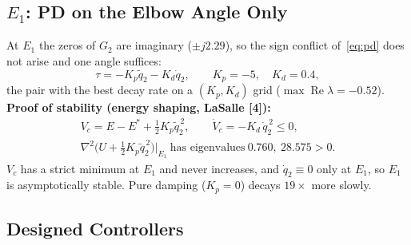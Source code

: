 \documentclass[12pt,a4paper]{article}
\begin{document}
\subsection{$E_1$: PD on the Elbow Angle Only}
At $E_1$ the zeros of $G_2$ are imaginary ($\pm j2.29$), so the sign conflict of~\eqref{eq:pd} does not arise and one angle suffices:
\begin{equation}
\tau=-K_p\tilde q_2-K_d\dot q_2,\qquad K_p=-5,\quad K_d=0.4,
\end{equation}
the pair with the best decay rate on a $(K_p,K_d)$ grid ($\max\operatorname{Re}\lambda=-0.52$).
\textbf{Proof of stability (energy shaping, LaSalle [4]):}
\begin{gather}
V_c=E-E^*+\tfrac12K_p\tilde q_2^{\,2},\qquad \dot V_c=-K_d\,\dot q_2^{\,2}\le0,\\
\nabla^2\big(U+\tfrac12K_p\tilde q_2^{\,2}\big)\big|_{E_1}\ \text{has eigenvalues}\ 0.760,\ 28.575>0 .\nonumber
\end{gather}
$V_c$ has a strict minimum at $E_1$ and never increases, and $\dot q_2\equiv0$ only at $E_1$, so $E_1$ is asymptotically stable. Pure damping ($K_p=0$) decays $19\times$ more slowly.

\subsection{Designed Controllers}
\begin{table}[H]
\centering
\caption{Phase 3 controllers and their closed-loop poles}
\label{tab:ctrl}
\small
{}
\end{table}
\end{document}
